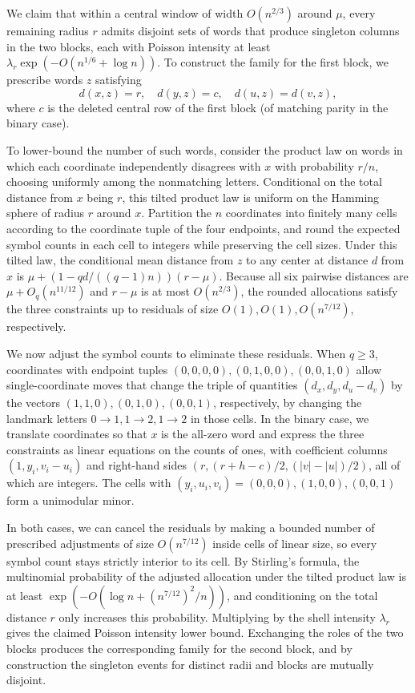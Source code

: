 We claim that within a central window of width \(O(n^{2/3})\) around \(\mu\), every remaining radius \(r\) admits disjoint sets of words that produce singleton columns in the two blocks, each with Poisson intensity at least \(\lambda_r\exp(-O(n^{1/6}+\log n))\). To construct the family for the first block, we prescribe words \(z\) satisfying
\[
 d(x,z)=r,\quad d(y,z)=c,\quad d(u,z)=d(v,z),
\]
where \(c\) is the deleted central row of the first block (of matching parity in the binary case).

To lower-bound the number of such words, consider the product law on words in which each coordinate independently disagrees with \(x\) with probability \(r/n\), choosing uniformly among the nonmatching letters. Conditional on the total distance from \(x\) being \(r\), this tilted product law is uniform on the Hamming sphere of radius \(r\) around \(x\). Partition the \(n\) coordinates into finitely many cells according to the coordinate tuple of the four endpoints, and round the expected symbol counts in each cell to integers while preserving the cell sizes. Under this tilted law, the conditional mean distance from \(z\) to any center at distance \(d\) from \(x\) is \(\mu+(1-qd/((q-1)n))(r-\mu)\). Because all six pairwise distances are \(\mu+O_q(n^{11/12})\) and \(r-\mu\) is at most \(O(n^{2/3})\), the rounded allocations satisfy the three constraints up to residuals of size \(O(1),O(1),O(n^{7/12})\), respectively.

We now adjust the symbol counts to eliminate these residuals. When \(q\ge3\), coordinates with endpoint tuples \((0,0,0,0),(0,1,0,0),(0,0,1,0)\) allow single-coordinate moves that change the triple of quantities \((d_x,d_y,d_u-d_v)\) by the vectors \((1,1,0),(0,1,0),(0,0,1)\), respectively, by changing the landmark letters \(0\to1,1\to2,1\to2\) in those cells. In the binary case, we translate coordinates so that \(x\) is the all-zero word and express the three constraints as linear equations on the counts of ones, with coefficient columns \((1,y_i,v_i-u_i)\) and right-hand sides \((r,(r+h-c)/2,(|v|-|u|)/2)\), all of which are integers. The cells with \((y_i,u_i,v_i)=(0,0,0),(1,0,0),(0,0,1)\) form a unimodular minor.

In both cases, we can cancel the residuals by making a bounded number of prescribed adjustments of size \(O(n^{7/12})\) inside cells of linear size, so every symbol count stays strictly interior to its cell. By Stirling's formula, the multinomial probability of the adjusted allocation under the tilted product law is at least \(\exp(-O(\log n+(n^{7/12})^2/n))\), and conditioning on the total distance \(r\) only increases this probability. Multiplying by the shell intensity \(\lambda_r\) gives the claimed Poisson intensity lower bound. Exchanging the roles of the two blocks produces the corresponding family for the second block, and by construction the singleton events for distinct radii and blocks are mutually disjoint.

